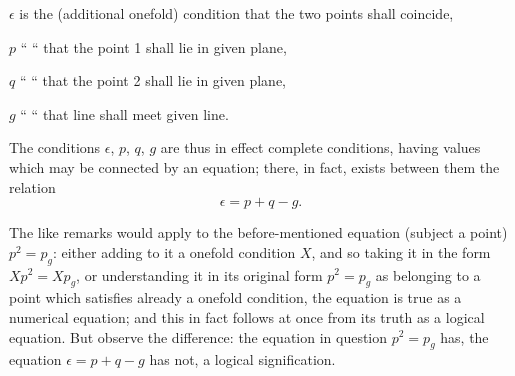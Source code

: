 \documentclass[11pt,a4paper]{book}
\begin{document}
\hspace*{2em} $\epsilon$ is the (additional onefold) condition that the two points shall coincide,

\hspace*{2em} $p$ \hspace{3.5em} `` \hspace{3.5em} `` \hspace{3.5em} that the point 1 shall lie in given plane,

\hspace*{2em} $q$ \hspace{3.5em} `` \hspace{3.5em} `` \hspace{3.5em} that the point 2 shall lie in given plane,

\hspace*{2em} $g$ \hspace{3.5em} `` \hspace{3.5em} `` \hspace{3.5em} that line shall meet given line.

The conditions $\epsilon$, $p$, $q$, $g$ are thus in effect complete conditions, having values which may be connected by an equation; there, in fact, exists between them the relation
\[
\epsilon = p + q - g.
\]

The like remarks would apply to the before-mentioned equation (subject a point) $p^2 = p_g$: either adding to it a onefold condition $X$, and so taking it in the form $Xp^2 = Xp_g$, or understanding it in its original form $p^2 = p_g$ as belonging to a point which satisfies already a onefold condition, the equation is true as a numerical equation; and this in fact follows at once from its truth as a logical equation. But observe the difference: the equation in question $p^2 = p_g$ has, the equation $\epsilon = p + q - g$ has not, a logical signification.
\end{document}
